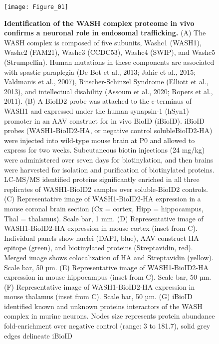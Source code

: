 
\begin{figure}[ht]
	\begin{fullwidth}
	\begin{center}
	\texttt{[image: Figure\_01]}
	\caption{ \textbf{Identification of the WASH complex proteome in vivo confirms a
		neuronal role in endosomal trafficking.}
		(A) The WASH complex is composed of five subunits, Washc1 (WASH1), Washc2
		(FAM21), Washc3 (CCDC53), Washc4 (SWIP), and Washc5 (Strumpellin). Human
		mutations in these components are associated with spastic paraplegia (De Bot et
		al., 2013; Jahic et al., 2015; Valdmanis et al., 2007), Ritscher-Schinzel
		Syndrome (Elliott et al., 2013), and intellectual disability (Assoum et al.,
		2020; Ropers et al., 2011). 
		(B) A BioID2 probe was attached to the c-terminus of WASH1 and expressed under
		the human synapsin-1 (hSyn1) promoter in an AAV construct for in vivo BioID
		(iBioID). iBioID probes (WASH1-BioID2-HA, or negative control solubleBioID2-HA)
		were injected into wild-type mouse brain at P0 and allowed to express for two
		weeks. Subcutaneous biotin injections (24 mg/kg) were administered over seven
		days for biotinylation, and then brains were harvested for isolation and
		purification of biotinylated proteins. LC-MS/MS identified proteins
		significantly enriched in all three replicates of WASH1-BioID2 samples over
		soluble-BioID2 controls. 
		(C) Representative image of WASH1-BioID2-HA expression in a mouse coronal brain
		section (Cx = cortex, Hipp = hippocampus, Thal = thalamus). Scale bar, 1 mm.
		(D) Representative image of WASH1-BioID2-HA expression in mouse cortex (inset
		from C). Individual panels show nuclei (DAPI, blue), AAV construct HA epitope
		(green), and biotinylated proteins (Streptavidin, red). Merged image shows
		colocalization of HA and Streptavidin (yellow). Scale bar, 50 µm. 
		(E) Representative image of WASH1-BioID2-HA expression in mouse hippocampus
		(inset from C). Scale bar, 50 µm.
		(F) Representative image of WASH1-BioID2-HA expression in mouse thalamus (inset
		from C). Scale bar, 50 µm.
		(G) iBioID identified known and unknown proteins interactors of the WASH complex
		in murine neurons. Nodes size represents protein abundance fold-enrichment over
		negative control (range: 3 to 181.7), solid grey edges delineate iBioID
}
\end{center}
\end{fullwidth}
\end{figure}
